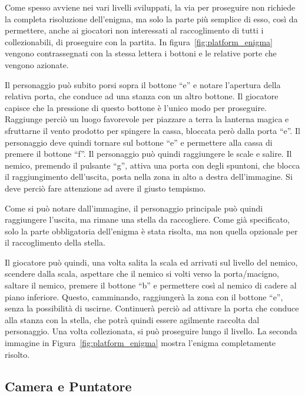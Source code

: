 Come spesso avviene nei vari livelli sviluppati, la via per proseguire non richiede la completa risoluzione dell’enigma, ma solo la parte più semplice di esso, così da permettere, anche ai giocatori non interessati al raccoglimento di tutti i collezionabili, di proseguire con la partita.
In figura~\ref{fig:platform_enigma} vengono contrassegnati con la stessa lettera i bottoni e le relative porte che vengono azionate.

Il personaggio può subito porsi sopra il bottone “e” e notare l’apertura della relativa porta, che conduce ad una stanza con un altro bottone. Il giocatore capisce che la pressione di questo bottone è l’unico modo per proseguire. Raggiunge perciò un luogo favorevole per piazzare a terra la lanterna magica e sfruttarne il vento prodotto per spingere la cassa, bloccata però dalla porta “e”. Il personaggio deve quindi tornare sul bottone “e” e permettere alla cassa di premere il bottone “f”. Il personaggio può quindi raggiungere le scale e salire. Il nemico, premendo il pulsante “g”, attiva una porta con degli spuntoni, che blocca il raggiungimento dell’uscita, posta nella zona in alto a destra dell’immagine. Si deve perciò fare attenzione ad avere il giusto tempismo.

Come si può notare dall’immagine, il personaggio principale può quindi raggiungere l’uscita, ma rimane una stella da raccogliere. Come già specificato, solo la parte obbligatoria dell’enigma è stata risolta, ma non quella opzionale per il raccoglimento della stella.

Il giocatore può quindi, una volta salita la scala ed arrivati sul livello del nemico, scendere dalla scala, aspettare che il nemico si volti verso la porta/macigno, saltare il nemico, premere il bottone “b” e permettere così al nemico di cadere al piano inferiore. Questo, camminando, raggiungerà la zona con il bottone “e”, senza la possibilità di uscirne. Continuerà perciò ad attivare la porta che conduce alla stanza con la stella, che potrà quindi essere agilmente raccolta dal personaggio. Una volta collezionata, si può proseguire lungo il livello.
La seconda immagine in Figura~\ref{fig:platform_enigma} mostra l’enigma completamente risolto.

\subsection{Camera e Puntatore}
\label{sec:camera_e_puntatore}

